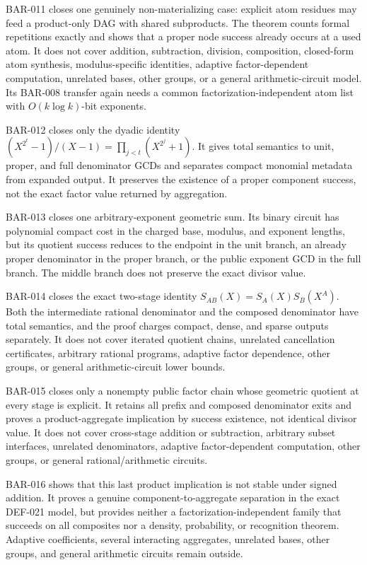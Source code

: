 \documentclass[11pt]{article}
\begin{document}
BAR-011 closes one genuinely non-materializing case: explicit atom residues
may feed a product-only DAG with shared subproducts. The theorem counts
formal repetitions exactly and shows that a proper node success already
occurs at a used atom. It does not cover addition, subtraction, division,
composition, closed-form atom synthesis, modulus-specific identities,
adaptive factor-dependent computation, unrelated bases, other groups, or a
general arithmetic-circuit model. Its BAR-008 transfer again needs a common
factorization-independent atom list with \(O(k\log k)\)-bit exponents.

BAR-012 closes only the dyadic identity
\((X^{2^t}-1)/(X-1)=\prod_{j<t}(X^{2^j}+1)\). It gives total semantics to
unit, proper, and full denominator GCDs and separates compact monomial
metadata from expanded output. It preserves the existence of a proper
component success, not the exact factor value returned by aggregation.

BAR-013 closes one arbitrary-exponent geometric sum. Its binary circuit has
polynomial compact cost in the charged base, modulus, and exponent lengths,
but its quotient success reduces to the endpoint in the unit branch, an
already proper denominator in the proper branch, or the public exponent GCD
in the full branch. The middle branch does not preserve the exact divisor
value.

BAR-014 closes the exact two-stage identity
\(S_{AB}(X)=S_A(X)S_B(X^A)\). Both the intermediate rational denominator and
the composed denominator have total semantics, and the proof charges compact,
dense, and sparse outputs separately. It does not cover iterated quotient
chains, unrelated cancellation certificates, arbitrary rational programs,
adaptive factor dependence, other groups, or general arithmetic-circuit lower
bounds.

BAR-015 closes only a nonempty public factor chain whose geometric quotient
at every stage is explicit. It retains all prefix and composed denominator
exits and proves a product-aggregate implication by success existence, not
identical divisor value. It does not cover cross-stage addition or
subtraction, arbitrary subset interfaces, unrelated denominators, adaptive
factor-dependent computation, other groups, or general rational/arithmetic
circuits.

BAR-016 shows that this last product implication is not stable under signed
addition. It proves a genuine component-to-aggregate separation in the exact
DEF-021 model, but provides neither a factorization-independent family that
succeeds on all composites nor a density, probability, or recognition
theorem. Adaptive coefficients, several interacting aggregates, unrelated
bases, other groups, and general arithmetic circuits remain outside.
\end{document}
